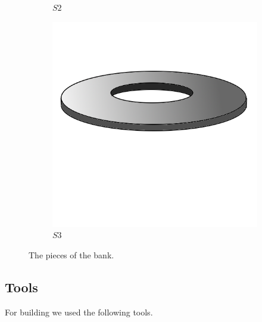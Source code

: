 \documentclass{subfiles}
\begin{document}
\begin{figure}[ht]
\begin{subfigure}[b]{0.3\textwidth}
            \caption{$S2$}
            \label{fig:S2}
        \end{subfigure}
        \hfill
        \begin{subfigure}[b]{0.3\textwidth}
            \centering
            \includegraphics[width=\textwidth]{Ressources/Piece_S3.png}
            \caption{$S3$}
            \label{fig:S3}
        \end{subfigure}
           \caption{The pieces of the bank.}
           \label{fig:Pieces}
   \end{figure}
   
   \subsection*{Tools}
        For building we used the following tools. 

\end{document}
